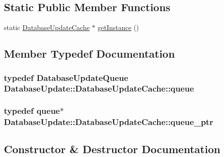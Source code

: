 \subsection*{Static Public Member Functions}
\begin{DoxyCompactItemize}
\item 
static \hyperlink{class_database_update_1_1_database_update_cache}{Database\+Update\+Cache} $\ast$ \hyperlink{class_database_update_1_1_database_update_cache_a979943759449eb5c67e1a21409705c4a}{get\+Instance} ()
\end{DoxyCompactItemize}


\subsection{Member Typedef Documentation}
\hypertarget{class_database_update_1_1_database_update_cache_a3cde0cbb392c58f6b3e8f5ad4ac747a9}{}
\subsubsection[{queue}]{\setlength{\rightskip}{0pt plus 5cm}typedef {\bf Database\+Update\+Queue} {\bf Database\+Update\+::\+Database\+Update\+Cache\+::queue}}\label{class_database_update_1_1_database_update_cache_a3cde0cbb392c58f6b3e8f5ad4ac747a9}
\hypertarget{class_database_update_1_1_database_update_cache_a529e26b49e3b31a4d5b885748524fed2}{}
\subsubsection[{queue\+\_\+ptr}]{\setlength{\rightskip}{0pt plus 5cm}typedef {\bf queue}$\ast$ {\bf Database\+Update\+::\+Database\+Update\+Cache\+::queue\+\_\+ptr}}\label{class_database_update_1_1_database_update_cache_a529e26b49e3b31a4d5b885748524fed2}


\subsection{Constructor \& Destructor Documentation}
\hypertarget{class_database_update_1_1_database_update_cache_a13baccbc79529f459da1fa91e0eac2a1}{}
